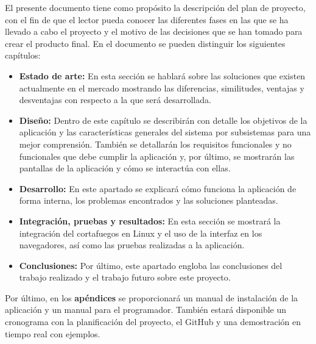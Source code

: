 El presente documento tiene como propósito la descripción del plan de proyecto, con el fin de que el lector pueda conocer las diferentes fases en las que se ha llevado a cabo el proyecto y el motivo de las decisiones que se han tomado para crear el producto final.
En el documento se pueden distinguir los siguientes capítulos:
\begin{itemize}
\item \textbf{Estado de arte:}  En esta sección se hablará sobre las soluciones que existen actualmente en el mercado mostrando las diferencias, similitudes, ventajas y desventajas con respecto a la que será desarrollada.
\item \textbf{Diseño:} Dentro de este capítulo se describirán con detalle los objetivos de la aplicación y las características generales del sistema por subsistemas para una mejor comprensión. También se detallarán los requisitos funcionales y no funcionales que debe cumplir la aplicación y, por último, se mostrarán las pantallas de la aplicación y cómo se interactúa con ellas.
\item \textbf{Desarrollo:} En este apartado se explicará cómo funciona la aplicación de forma interna, los problemas encontrados y las soluciones planteadas.
\item \textbf{Integración, pruebas y resultados: }En esta sección se mostrará la integración del cortafuegos en Linux y el uso de la interfaz en los navegadores, así como las pruebas realizadas a la aplicación.
\item \textbf{Conclusiones: }Por último, este apartado engloba las conclusiones del trabajo realizado y el trabajo futuro sobre este proyecto.
\end{itemize}
Por último, en los \textbf{apéndices} se proporcionará un manual de instalación de la aplicación y un manual para el programador. También estará disponible un cronograma con la planificación del proyecto, el GitHub y una demostración en tiempo real con ejemplos. 